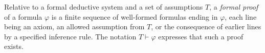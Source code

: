 
Relative to a formal deductive system and a set of assumptions $T$, a \emph{formal proof} of a formula $\varphi$ is a finite sequence of well-formed formulas ending in $\varphi$, each line being an axiom, an allowed assumption from $T$, or the consequence of earlier lines by a specified inference rule. The notation $T\vdash\varphi$ expresses that such a proof exists.
